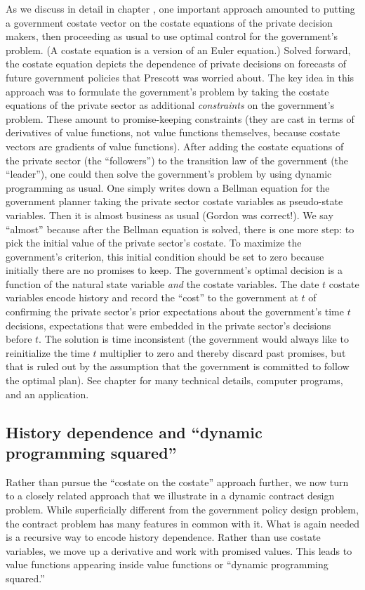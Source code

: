 \newpage

As we discuss in detail in chapter ,
one important approach   amounted to putting a government  costate vector
on the costate  equations of the private decision makers,
then proceeding as usual to use optimal control for the government's
problem.
(A costate equation
is a version of an Euler equation.)
 Solved forward, the costate equation
depicts the dependence of private  decisions on forecasts
of future government policies that Prescott was worried about.
The key idea in this approach  was to formulate
the government's problem by taking the costate
equations of the private sector as additional {\it constraints\/}
on the government's problem. These  amount to promise-keeping
constraints (they are cast in terms of derivatives of value functions,
 not value functions themselves, because costate vectors are
gradients of value functions). After adding the  costate equations
of the  private sector (the ``followers'') to the transition
law of the government (the  ``leader''), one could then solve
the government's problem by using dynamic programming as usual.
One simply writes down a Bellman equation for the  government
planner taking the private sector costate variables as
pseudo-state variables. Then it is   almost business as
usual (Gordon was correct!). We say ``almost'' because     after the
Bellman equation is solved, there is one more step: to pick the
initial value of the private sector's costate.  To maximize the government's
criterion, this initial
condition should be set to  zero because initially there are no
promises to keep. The government's optimal decision   is a
function of the natural state variable {\it and\/} the costate
variables.
   The date $t$
 costate variables encode history and record the ``cost'' to the
government at $t$ of confirming the   private sector's  prior expectations
about the government's time $t$ decisions, expectations
that were embedded in the private sector's  decisions before $t$.
The solution is time inconsistent (the government would  always like to
reinitialize the time $t$ multiplier to zero and thereby discard
past promises, but that is ruled out by the assumption that the
government is committed to follow the optimal plan).
See chapter  for  many technical details, computer programs,
 and an application.

\subsection{History dependence and ``dynamic programming squared''}
 Rather than pursue the ``costate on the costate'' approach further,
we now turn  to a closely related approach that we illustrate in a
dynamic contract design problem. While superficially
different from the government policy design problem, the contract problem
  has
many features in common with it.   What is again needed is a recursive way
to encode history dependence.   Rather than use costate variables,
we move up a derivative and work with promised values. This leads
to value functions appearing inside value functions or
``dynamic programming squared.''

